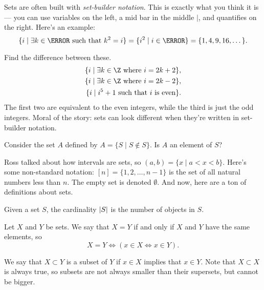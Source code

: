 Sets are often built with \emph{set-builder notation}. This is exactly what you think it is --- you can use variables on the left, a mid bar in the middle $\mid$, and quantifies on the right. Here's an example:
\[ \{i \mid \exists k\in\N \text{ such that } k^2=i\} = \{i^2 \mid i \in \N\} = \{1, 4, 9, 16, \dotsc\}. \]

\begin{example}
Find the difference between these.
\begin{align*}
\{i \mid \exists k \in \Z \text{ where } i = 2k+2\}, \\
\{i \mid \exists k \in \Z \text{ where } i = 2k-2\}, \\
\{i \mid i^5 + 1 \text{ such that $i$ is even}\}.
\end{align*}
The first two are equivalent to the even integers, while the third is just the odd integers. Moral of the story: sets can look different when they're written in set-builder notation.
\end{example}

\begin{example}
Consider the set $A$ defined by $A = \{S \mid S \notin S\}$. Is $A$ an element of $S$?
\end{example}

Ross talked about how intervals are sets, so $(a,b) = \{x \mid a < x < b\}$. Here's some non-standard notation: $[n] = \{1, 2, \dotsc, n-1\}$ is the set of all natural numbers less than $n$. The empty set is denoted $\emptyset$. And now, here are a ton of definitions about sets.

\begin{definition}
Given a set $S$, the cardinality $\abs{S}$ is the number of objects in $S$.
\end{definition}

\begin{definition}
Let $X$ and $Y$ be sets. We say that $X = Y$ if and only if $X$ and $Y$ have the same elements, so 
\[ X = Y \iff (x \in X \iff x \in Y).  \]
\end{definition}

\begin{definition}[Subset]
We say that $X \subset Y$ is a subset of $Y$ if $x \in X$ implies that $x \in Y$. Note that $X \subset X$ is always true, so subsets are not always smaller than their supersets, but cannot be bigger.
\end{definition}

